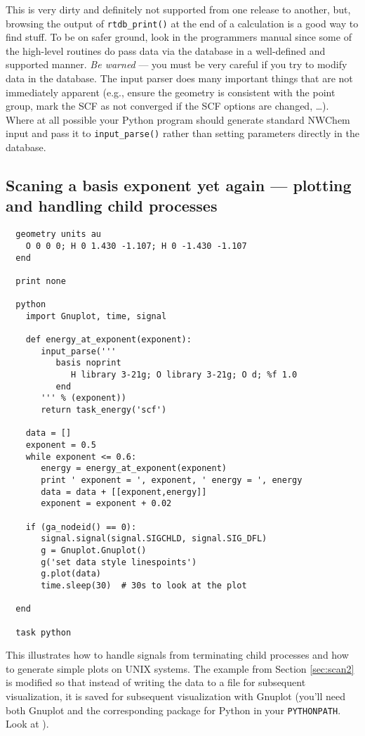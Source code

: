 This is very dirty and definitely not supported from one release to
another, but, browsing the output of \verb+rtdb_print()+ at the end of
a calculation is a good way to find stuff.  To be on safer ground,
look in the programmers manual since some of the high-level routines
do pass data via the database in a well-defined and supported manner.
{\em Be warned} --- you must be very careful if you try to modify data
in the database. The input parser does many important things that are
not immediately apparent (e.g., ensure the geometry is consistent with
the point group, mark the SCF as not converged if the SCF options are
changed, \ldots).  Where at all possible your Python program should
generate standard NWChem input and pass it to \verb+input_parse()+
rather than setting parameters directly in the database.

\subsection{Scaning a basis exponent yet again --- plotting and 
handling child processes}
\label{sec:sigchld}

\begin{verbatim}
  geometry units au
    O 0 0 0; H 0 1.430 -1.107; H 0 -1.430 -1.107
  end

  print none

  python
    import Gnuplot, time, signal

    def energy_at_exponent(exponent):
       input_parse('''
          basis noprint
             H library 3-21g; O library 3-21g; O d; %f 1.0
          end
       ''' % (exponent))
       return task_energy('scf')

    data = []
    exponent = 0.5
    while exponent <= 0.6:
       energy = energy_at_exponent(exponent)
       print ' exponent = ', exponent, ' energy = ', energy
       data = data + [[exponent,energy]]
       exponent = exponent + 0.02

    if (ga_nodeid() == 0):
       signal.signal(signal.SIGCHLD, signal.SIG_DFL)
       g = Gnuplot.Gnuplot()
       g('set data style linespoints')
       g.plot(data)
       time.sleep(30)  # 30s to look at the plot

  end

  task python
\end{verbatim}

This illustrates how to handle signals from terminating child
processes and how to generate simple plots on UNIX systems.  The
example from Section \ref{sec:scan2} is modified so that instead of
writing the data to a file for subsequent visualization, it is saved
for subsequent visualization with Gnuplot (you'll need both Gnuplot
and the corresponding package for Python in your \verb+PYTHONPATH+.
Look at ).

